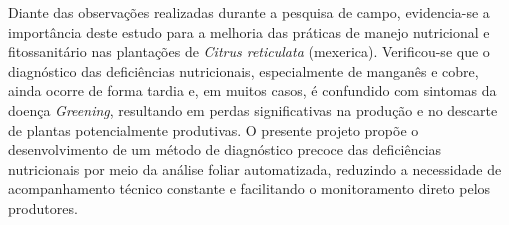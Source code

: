 \medskip
Diante das observações realizadas durante a pesquisa de campo, evidencia-se a 
importância deste estudo para a melhoria das práticas de manejo nutricional e 
fitossanitário nas plantações de \textit{Citrus reticulata} (mexerica). 
Verificou-se que o diagnóstico das deficiências nutricionais, especialmente 
de manganês e cobre, ainda ocorre de forma tardia e, em muitos casos, 
é confundido com sintomas da doença \textit{Greening}, resultando 
em perdas significativas na produção e no descarte de plantas potencialmente 
produtivas. O presente projeto propõe o desenvolvimento de um método de 
diagnóstico precoce das deficiências nutricionais por meio da análise foliar 
automatizada, reduzindo a necessidade de acompanhamento técnico constante e 
facilitando o monitoramento direto pelos produtores.
\medskip